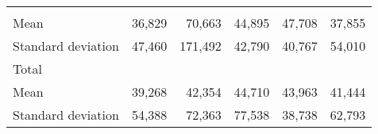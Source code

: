 \begin{tabular}{llllll}
  \multicolumn{1}{|r}{} &
  \multicolumn{1}{r}{} &
  \multicolumn{1}{r}{} &
  \multicolumn{1}{r}{} &
  \multicolumn{1}{r}{} \\
\multicolumn{1}{l}{\hspace{4em}Mean} &
  \multicolumn{1}{|r}{36,829} &
  \multicolumn{1}{r}{70,663} &
  \multicolumn{1}{r}{44,895} &
  \multicolumn{1}{r}{47,708} &
  \multicolumn{1}{r}{37,855} \\
\multicolumn{1}{l}{\hspace{4em}Standard deviation} &
  \multicolumn{1}{|r}{47,460} &
  \multicolumn{1}{r}{171,492} &
  \multicolumn{1}{r}{42,790} &
  \multicolumn{1}{r}{40,767} &
  \multicolumn{1}{r}{54,010} \\
\multicolumn{1}{l}{\hspace{3em}Total} &
  \multicolumn{1}{|r}{} &
  \multicolumn{1}{r}{} &
  \multicolumn{1}{r}{} &
  \multicolumn{1}{r}{} &
  \multicolumn{1}{r}{} \\
\multicolumn{1}{l}{\hspace{4em}Mean} &
  \multicolumn{1}{|r}{39,268} &
  \multicolumn{1}{r}{42,354} &
  \multicolumn{1}{r}{44,710} &
  \multicolumn{1}{r}{43,963} &
  \multicolumn{1}{r}{41,444} \\
\multicolumn{1}{l}{\hspace{4em}Standard deviation} &
  \multicolumn{1}{|r}{54,388} &
  \multicolumn{1}{r}{72,363} &
  \multicolumn{1}{r}{77,538} &
  \multicolumn{1}{r}{38,738} &
  \multicolumn{1}{r}{62,793} \\
\cline{1-6}
\end{tabular}

